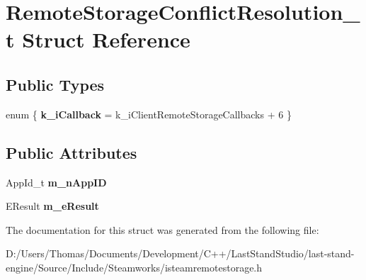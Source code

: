 \hypertarget{structRemoteStorageConflictResolution__t}{}\section{Remote\+Storage\+Conflict\+Resolution\+\_\+t Struct Reference}
\label{structRemoteStorageConflictResolution__t}
\subsection*{Public Types}
\begin{DoxyCompactItemize}
\item 
\hypertarget{structRemoteStorageConflictResolution__t_a8171f91c42e0408e93d12aeb50614eab}{}enum \{ {\bfseries k\+\_\+i\+Callback} = k\+\_\+i\+Client\+Remote\+Storage\+Callbacks + 6
 \}\label{structRemoteStorageConflictResolution__t_a8171f91c42e0408e93d12aeb50614eab}

\end{DoxyCompactItemize}
\subsection*{Public Attributes}
\begin{DoxyCompactItemize}
\item 
\hypertarget{structRemoteStorageConflictResolution__t_ac29954ae90df1c3d4ff5e1e4d99bb8be}{}App\+Id\+\_\+t {\bfseries m\+\_\+n\+App\+I\+D}\label{structRemoteStorageConflictResolution__t_ac29954ae90df1c3d4ff5e1e4d99bb8be}

\item 
\hypertarget{structRemoteStorageConflictResolution__t_ac3d552af6b06347007f544ab81cd6c8c}{}E\+Result {\bfseries m\+\_\+e\+Result}\label{structRemoteStorageConflictResolution__t_ac3d552af6b06347007f544ab81cd6c8c}

\end{DoxyCompactItemize}


The documentation for this struct was generated from the following file\+:\begin{DoxyCompactItemize}
\item 
D\+:/\+Users/\+Thomas/\+Documents/\+Development/\+C++/\+Last\+Stand\+Studio/last-\/stand-\/engine/\+Source/\+Include/\+Steamworks/isteamremotestorage.\+h\end{DoxyCompactItemize}

